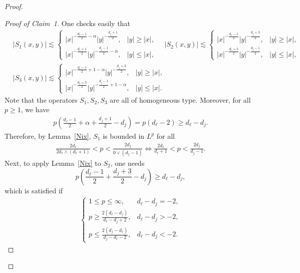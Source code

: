 \documentclass[10pt,a4paper]{amsart}
\begin{document}
\begin{proof}
\begin{proof}[Proof of Claim~1]
One checks easily that 
\begin{align*}
&|S_1(x,y)| \lesssim \begin{cases}
        |x|^{-\frac{d_\ell-1}{2}-\alpha} |y|^{-\frac{d_j+1}{2}}, & |y| \ge |x|,\\
        |x|^{-\frac{d_\ell+1}{2}} |y|^{-\frac{d_j-1}{2}-\alpha}, & |y|\le |x|,
    \end{cases} \quad     |S_2(x,y)| \lesssim \begin{cases}
        |x|^{-\frac{d_\ell-1}{2}} |y|^{-\frac{d_j+3}{2}}, & |y| \ge |x|,\\
        |x|^{-\frac{d_\ell+3}{2}} |y|^{-\frac{d_j-1}{2}}, & |y|\le |x|,
    \end{cases}\\
    &|S_3(x,y)| \lesssim \begin{cases}
        |x|^{-\frac{d_\ell-1}{2}+1-\alpha} |y|^{-\frac{d_j+3}{2}}, & |y| \ge |x|,\\
        |x|^{-\frac{d_\ell+3}{2}} |y|^{-\frac{d_j-1}{2}+1-\alpha}, & |y|\le |x|.
    \end{cases}
\end{align*}
Note that the  operators $S_1,S_2,S_3$ are all of homogeneous type. Moreover, for all $p\ge 1$, we have
\begin{align*}
    p \left(\frac{d_\ell-1}{2} + \alpha + \frac{d_j+1}{2} - d_j \right) = p (d_\ell-2) \ge d_\ell-d_j.
\end{align*}
Therefore, by Lemma~\ref{Nix}, $S_1$ is bounded in $L^p$ for all
\begin{align}\label{S1}
    \frac{2d_\ell}{2d_\ell \wedge (d_\ell+1)} < p < \frac{2d_j}{0 \vee (d_j-1)} \iff \frac{2d_\ell}{d_\ell+1} < p < \frac{2d_j}{d_j-1}.
\end{align}
Next, to apply Lemma~\ref{Nix} to $S_2$, one needs
\begin{equation*}
    p\left( \frac{d_\ell-1}{2} + \frac{d_j+3}{2} - d_j \right) \ge d_\ell-d_j,
\end{equation*}
which is satisfied if
\begin{align*}
    \begin{cases}
        1\le p \le \infty, & d_\ell-d_j=-2, \\
        p\ge \frac{2(d_\ell-d_j)}{d_\ell-d_j+2}, & d_\ell-d_j>-2,\\
        p \le \frac{2(d_j-d_\ell)}{d_j-d_\ell-2}, & d_\ell-d_j<-2.
    \end{cases}
\end{align*}

\end{proof}
\end{proof}
\end{document}
